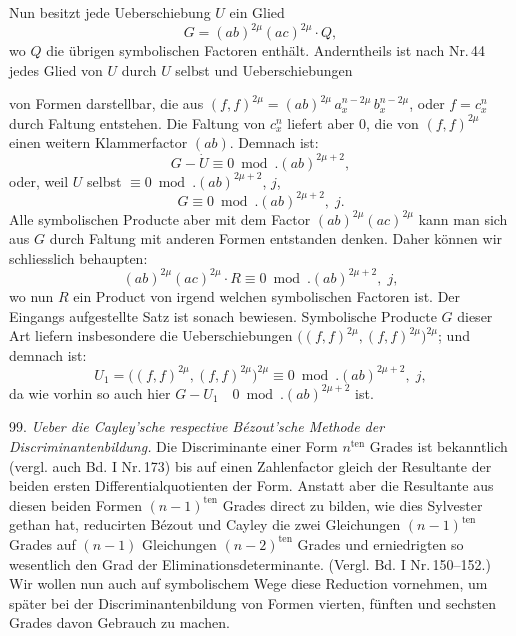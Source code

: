 Nun besitzt jede Ueberschiebung $U$ ein Glied
\[
G = (ab)^{2\mu}(ac)^{2\mu}\cdot Q,
\]
wo $Q$ die übrigen symbolischen Factoren enthält. Anderntheils ist
nach Nr.\,44 jedes Glied von $U$ durch $U$ selbst und Ueberschiebungen


von Formen darstellbar, die aus $(f,f)^{2\mu} = (ab)^{2\mu}\,a_x^{n-2\mu}\,b_x^{n-2\mu}$, oder
$f = c_x^n$ durch Faltung entstehen. Die Faltung von $c_x^n$ liefert aber 0,
die von $(f,f)^{2\mu}$ einen weitern Klammerfactor $(ab)$. Demnach ist:
\[
G - \dot U \equiv 0 \bmod. (ab)^{2\mu+2}, %
\]
oder, weil $U$ selbst $\equiv 0 \bmod. (ab)^{2\mu+2}$, $j$,
\[
G \equiv 0 \bmod. (ab)^{2\mu+2}, \; j.
\]
Alle symbolischen Producte aber mit dem Factor $(ab)^{2\mu}(ac)^{2\mu}$ kann
man sich aus $G$ durch Faltung mit anderen Formen entstanden denken.
Daher können wir schliesslich behaupten:
\[
(ab)^{2\mu}(ac)^{2\mu}\cdot R \equiv 0 \bmod. (ab)^{2\mu+2}, \; j,
\]
wo nun $R$ ein Product von irgend welchen symbolischen Factoren ist.
Der Eingangs aufgestellte Satz ist sonach bewiesen. Symbolische
Producte $G$ dieser Art liefern insbesondere die Ueberschiebungen
$\big((f,f)^{2\mu}, (f,f)^{2\mu}\big)^{2\mu}$; und demnach ist:
\[
U_1 = \big((f,f)^{2\mu}, (f,f)^{2\mu}\big)^{2\mu} \equiv 0 \bmod. (ab)^{2\mu+2}, \; j, %
\]
da wie vorhin so auch hier $G - U_1 \quad 0 \bmod. (ab)^{2\mu+2}$ ist. %

99. \textit{Ueber die Cayley'sche respective Bézout'sche Methode der
Discriminantenbildung.} Die Discriminante einer Form $n^{\text{ten}}$ Grades ist
bekanntlich (vergl. auch Bd. I Nr.\,173) bis auf einen Zahlenfactor gleich
der Resultante der beiden ersten Differentialquotienten der Form.
Anstatt aber die Resultante aus diesen beiden Formen $(n-1)^{\text{ten}}$ Grades
direct zu bilden, wie dies Sylvester gethan hat, reducirten Bézout und
Cayley die zwei Gleichungen $(n-1)^{\text{ten}}$ Grades auf $(n-1)$ Gleichungen
$(n-2)^{\text{ten}}$ Grades und erniedrigten so wesentlich den Grad der Eliminationsdeterminante.
(Vergl. Bd. I Nr.\,150--152.) Wir wollen nun auch auf
symbolischem Wege diese Reduction vornehmen, um später bei der
Discriminantenbildung von Formen vierten, fünften und sechsten
Grades davon Gebrauch zu machen.


